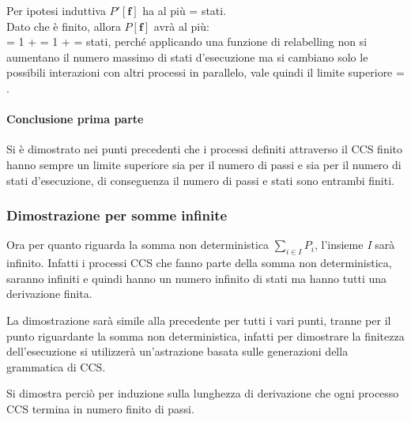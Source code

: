 \begin{itemize}
\begin{itemize}
		Per ipotesi induttiva  $P'\mathbf{[f]}$ ha al più  =  stati. \\
		Dato che  è finito, allora $P \mathbf{[f]}$ avrà al più: \\
		 = 1 +  = 1 +  =  stati, perché applicando una funzione di relabelling non si aumentano il numero massimo di stati d'esecuzione ma si cambiano solo le possibili interazioni con altri processi in parallelo, vale quindi il limite superiore  = .
		
	\end{itemize}
\end{itemize}

\paragraph{Conclusione prima parte} \mbox{}

Si è dimostrato nei punti precedenti che i processi definiti attraverso il CCS finito hanno sempre un limite superiore sia per il numero di passi e sia per il numero di stati d'esecuzione, di conseguenza il numero di passi e stati sono entrambi finiti.

\subsubsection{Dimostrazione per somme infinite}
Ora per quanto riguarda la somma non deterministica $\displaystyle\sum_{i\in I}^{}P_{i}$, l'insieme \textit{I} sarà infinito. Infatti i processi CCS che fanno parte della somma non deterministica, saranno infiniti e quindi hanno un numero infinito di stati ma hanno tutti una derivazione finita.

La dimostrazione sarà simile alla precedente per tutti i vari punti, tranne per il punto riguardante la somma non deterministica, infatti per dimostrare la finitezza dell'esecuzione si utilizzerà un'astrazione basata sulle generazioni della grammatica di CCS.

Si dimostra perciò per induzione sulla lunghezza di derivazione che ogni processo CCS termina in numero finito di passi.

